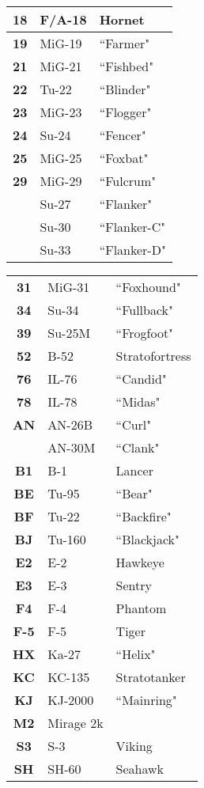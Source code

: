 \documentclass[fontHelvetica, widesubsec]{TechCheck}
\begin{document}
\begin{multicols*}{2}
\begin{center}
\begin{tabular}{c | p{1.5cm}  p{2.5cm}}
				\textbf{18} & F/A-18 & Hornet \\
				\midrule
				\textbf{19} & MiG-19 & ``Farmer" \\
				\textbf{21} & MiG-21 & ``Fishbed" \\
				\textbf{22} & Tu-22 & ``Blinder" \\
				\textbf{23} & MiG-23 & ``Flogger" \\
				\textbf{24} & Su-24 & ``Fencer" \\
				\textbf{25} & MiG-25 & ``Foxbat" \\
				\midrule
				\textbf{29} & MiG-29 & ``Fulcrum" \\
				& Su-27 & ``Flanker" \\
				& Su-30 & ``Flanker-C" \\
				& Su-33 & ``Flanker-D" \\
				\midrule
			\end{tabular}
		\end{center}
		\columnbreak

		\begin{center}
			\begin{tabular}{c | p{1.5cm}  p{2.5cm}}
				\midrule
				\textbf{31} & MiG-31 & ``Foxhound" \\
				\textbf{34} & Su-34 & ``Fullback" \\
				\textbf{39} & Su-25M & ``Frogfoot" \\
				\midrule
				\textbf{52} & B-52 & Stratofortress \\
				\midrule
				\textbf{76} & IL-76 & ``Candid" \\
				\textbf{78} & IL-78 & ``Midas" \\
				\textbf{AN} & AN-26B & ``Curl" \\
				& AN-30M & ``Clank" \\
				\midrule
				\textbf{B1} & B-1 & Lancer \\
				\midrule
				\textbf{BE} & Tu-95 & ``Bear" \\
				\textbf{BF} & Tu-22 & ``Backfire" \\
				\textbf{BJ} & Tu-160 & ``Blackjack" \\
				\midrule
				\textbf{E2} & E-2 & Hawkeye \\
				\textbf{E3} & E-3 & Sentry \\
				\midrule
				\textbf{F4} & F-4 & Phantom \\
				\textbf{F-5} & F-5 & Tiger \\
				\midrule
				\textbf{HX} & Ka-27 & ``Helix" \\
				\midrule
				\textbf{KC} & KC-135 & Stratotanker \\
				\midrule
				\textbf{KJ} & KJ-2000 & ``Mainring" \\
				\textbf{M2} & Mirage 2k & \\
				\midrule
				\textbf{S3} & S-3 & Viking\\
				\textbf{SH} & SH-60 & Seahawk \\
				\bottomrule
			\end{tabular}
		\end{center}
	\end{multicols*}
\end{document}
